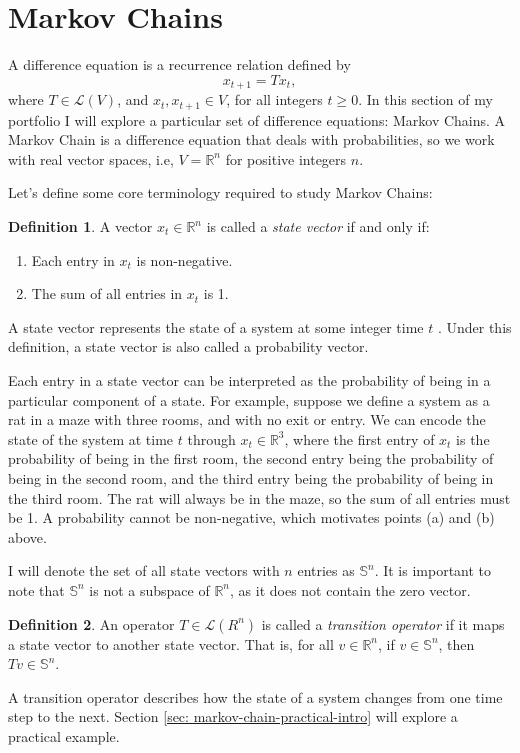 \documentclass{article}
\renewcommand{\L}{\mathcal{L}}
\newcommand{\R}{\mathbb{R}}
\renewcommand{\S}{\mathbb{S}}
\theoremstyle{definition}
\newtheorem{definition}{Definition}
\begin{document}
\section{Markov Chains}
\label{sec: markov-chains}

A difference equation is a recurrence relation defined by $$x_{t + 1} = Tx_{t},$$ where $T \in \L(V)$, and $x_{t}, x_{t + 1} \in V$, for all integers $t \geq 0$. In this section of my portfolio I will explore a particular set of difference equations: Markov Chains. A Markov Chain is a difference equation that deals with probabilities, so we work with real vector spaces, i.e, $V = \R^n$ for positive integers $n$.

Let's define some core terminology required to study Markov Chains:

\begin{definition}
    A vector $x_t \in \R^n$ is called a \textit{state vector} if and only if:
    \begin{enumerate}[label = (\alph*)]
        \item Each entry in $x_t$ is non-negative.
        \item The sum of all entries in $x_t$ is 1.
    \end{enumerate}
    A state vector represents the state of a system at some integer time $t$ \cite{margalit_2019_interactive}. Under this definition, a state vector is also called a probability vector.
\end{definition}
Each entry in a state vector can be interpreted as the probability of being in a particular component of a state. For example, suppose we define a system as a rat in a maze with three rooms, and with no exit or entry. We can encode the state of the system at time $t$ through $x_t \in \R^3$, where the first entry of $x_t$ is the probability of being in the first room, the second entry being the probability of being in the second room, and the third entry being the probability of being in the third room. The rat will always be in the maze, so the sum of all entries must be 1. A probability cannot be non-negative, which motivates points (a) and (b) above.

I will denote the set of all state vectors with $n$ entries as $\S^n$. It is important to note that $\S^n$ is not a subspace of $\R^n$, as it does not contain the zero vector.

\begin{definition}
    An operator $T \in \L(R^n)$ is called a \textit{transition operator} if it maps a state vector to another state vector. That is, for all $v \in \R^n$, if $v \in \S^n$, then $Tv \in \S^n$.
\end{definition}
A transition operator describes how the state of a system changes from one time step to the next. Section \ref{sec: markov-chain-practical-intro} will explore a practical example.
\end{document}
